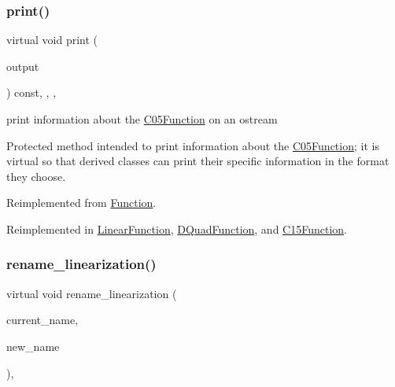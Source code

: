 \subsubsection{\texorpdfstring{print()}{print()}}
{\footnotesize\ttfamily virtual void print (\begin{DoxyParamCaption}\item[{std\+::ostream \&}]{output }\end{DoxyParamCaption}) const\hspace{0.3cm}{\ttfamily [inline]}, {\ttfamily [override]}, {\ttfamily [protected]}, {\ttfamily [virtual]}}



print information about the \mbox{\hyperlink{class_s_m_spp__di__unipi__it_1_1_c05_function}{C05\+Function}} on an ostream 

Protected method intended to print information about the \mbox{\hyperlink{class_s_m_spp__di__unipi__it_1_1_c05_function}{C05\+Function}}; it is virtual so that derived classes can print their specific information in the format they choose. 

Reimplemented from \mbox{\hyperlink{class_s_m_spp__di__unipi__it_1_1_function_a2e7b9c9148a98c5c342e8c25cac95926}{Function}}.



Reimplemented in \mbox{\hyperlink{class_s_m_spp__di__unipi__it_1_1_linear_function_a87f6fa05f41e6d6f00fc4e0b12321abc}{Linear\+Function}}, \mbox{\hyperlink{class_s_m_spp__di__unipi__it_1_1_d_quad_function_a4e1f59c2589efba7c429a92661a1f288}{D\+Quad\+Function}}, and \mbox{\hyperlink{class_s_m_spp__di__unipi__it_1_1_c15_function_a59a9fcbf8f9f86d348344b2073644b0e}{C15\+Function}}.

\mbox{\label{class_s_m_spp__di__unipi__it_1_1_c05_function_acfc994eb90b924695d059aeddef6dc00}} 
\subsubsection{\texorpdfstring{rename\+\_\+linearization()}{rename\_linearization()}}
{\footnotesize\ttfamily virtual void rename\+\_\+linearization (\begin{DoxyParamCaption}\item[{const \mbox{\hyperlink{class_s_m_spp__di__unipi__it_1_1_c05_function_ae90bf93c6d4b4ada66791c735d1c03cc}{Linearization\+Name}}}]{current\+\_\+name,  }\item[{const \mbox{\hyperlink{class_s_m_spp__di__unipi__it_1_1_c05_function_ae90bf93c6d4b4ada66791c735d1c03cc}{Linearization\+Name}}}]{new\+\_\+name }\end{DoxyParamCaption})\hspace{0.3cm}{\ttfamily [inline]}, {\ttfamily [virtual]}}



